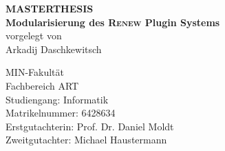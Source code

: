 \usepackage{colortbl}	
\usepackage{xcolor}
\usepackage[T1]{fontenc}
\usepackage{rotating}
\usepackage{hyphenat}
\usepackage{hyphenat}
\usepackage[bottom]{footmisc}



% 
\begin{titlepage}


\vspace*{2cm}
\Large
\begin{center}
              {\color{uhhred}\textbf{{MASTERTHESIS}}}
\vspace*{2.0cm}\\
{\LARGE \textbf{Modularisierung des \textsc{Renew} Plugin Systems}}
\vspace*{2.0cm}\\
vorgelegt von
\vspace*{0.4cm}\\
Arkadij Daschkewitsch
\end{center}
\vspace*{3.7cm}

\noindent
MIN-Fakultät \vspace*{0.25cm} \\
Fachbereich ART \vspace*{0.25cm} \\
Studiengang: Informatik \vspace*{0.25cm} \\
Matrikelnummer: 6428634\vspace*{0.5cm} \\
Erstgutachterin: Prof. Dr. Daniel Moldt \vspace*{0.25cm} \\
Zweitgutachter: Michael Haustermann               %
\end{titlepage}
